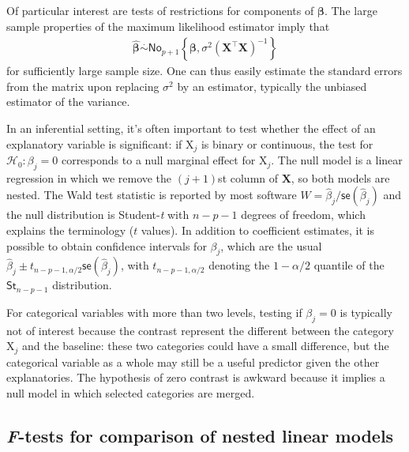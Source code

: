 \documentclass[
  11pt,
  letterpaper,
]{book}
\theoremstyle{definition}
\theoremstyle{definition}
\theoremstyle{definition}
\theoremstyle{definition}
\theoremstyle{remark}
\begin{document}
Of particular interest are tests of restrictions for components of \(\boldsymbol{\beta}\). The large sample properties of the maximum likelihood estimator imply that
\begin{align*}
\widehat{\boldsymbol{\beta}} \stackrel{\cdot}{\sim}\mathsf{No}_{p+1}\left\{\boldsymbol{\beta}, \sigma^2(\mathbf{X}^\top\mathbf{X})^{-1}\right\}
\end{align*}
for sufficiently large sample size. One can thus easily estimate the standard errors from the matrix upon replacing \(\sigma^2\) by an estimator, typically the unbiased estimator of the variance.

In an inferential setting, it's often important to test whether the effect of an explanatory variable is significant: if \(\mathrm{X}_j\) is binary or continuous, the test for \(\mathscr{H}_0: \beta_j=0\) corresponds to a null marginal effect for \(\mathrm{X}_j\). The null model is a linear regression in which we remove the \((j+1)\)st column of \(\mathbf{X}\), so both models are nested. The Wald test statistic is reported by most software \(W=\widehat{\beta}_j/\mathsf{se}(\widehat{\beta}_j)\) and the null distribution is Student-\emph{t} with \(n-p-1\) degrees of freedom, which explains the terminology (\(t\) values). In addition to coefficient estimates, it is possible to obtain confidence intervals for \(\beta_j\), which are the usual \(\widehat{\beta}_j \pm t_{n-p-1,\alpha/2} \mathsf{se}(\widehat{\beta}_j)\), with \(t_{n-p-1,\alpha/2}\) denoting the \(1-\alpha/2\) quantile of the \(\mathsf{St}_{n-p-1}\) distribution.

For categorical variables with more than two levels, testing if \(\beta_j=0\) is typically not of interest because the contrast represent the different between the category \(\mathrm{X}_j\) and the baseline: these two categories could have a small difference, but the categorical variable as a whole may still be a useful predictor given the other explanatories. The hypothesis of zero contrast is awkward because it implies a null model in which selected categories are merged.

\hypertarget{ftestslm}{%
\subsection{\texorpdfstring{\emph{F}-tests for comparison of nested linear models}{F-tests for comparison of nested linear models}}\label{ftestslm}}
\end{document}
